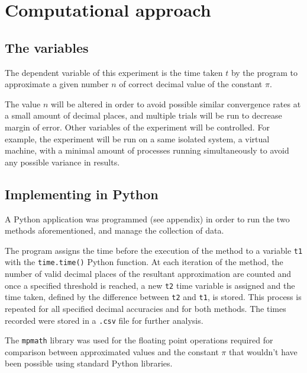 \section{Computational approach}

\subsection{The variables}
The dependent variable of this experiment is the time taken $t$ by the program 
to approximate a given number $n$ of correct decimal value of the constant $\pi$.

The value $n$ will be altered in order to avoid possible similar convergence rates 
at a small amount of decimal places, and multiple trials will be run to decrease 
margin of error. Other variables of the experiment will be controlled. For example, the experiment 
will be run on a same isolated system, a virtual machine, with a minimal amount of 
processes running simultaneously to avoid any possible variance in results. 


\subsection{Implementing in Python}

A Python application was programmed (see appendix) in order to run the two 
methods aforementioned, and manage the collection of data. 

The program assigns the time before the execution of the method to a variable \verb|t1| 
with the \verb|time.time()| Python function. At each iteration of the method, the number of valid decimal 
places of the resultant approximation are counted and once a specified threshold is reached, 
a new \verb|t2| time variable is assigned and the time taken, defined by the difference between 
\verb|t2| and \verb|t1|, is stored. This process is repeated for all specified decimal accuracies and 
for both methods. The times recorded were stored in a \verb|.csv| file for further analysis. 

The \verb|mpmath| library was used for the floating point operations required 
for comparison between approximated values and the constant $\pi$ that wouldn't 
have been possible using standard Python libraries. \cite{mpmath} 